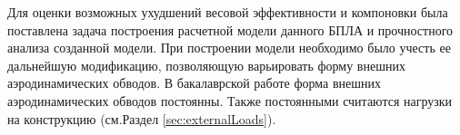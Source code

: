 
Для оценки возможных ухудшений весовой эффективности и компоновки была поставлена задача построения расчетной модели данного БПЛА и прочностного анализа созданной модели. 
При построении модели необходимо было учесть ее дальнейшую модификацию, позволяющую варьировать форму внешних аэродинамических обводов. В бакалаврской работе форма внешних аэродинамических обводов постоянны. Также постоянными считаются нагрузки на конструкцию (см.Раздел \ref{sec:externalLoads}). 


 
  
  

%

